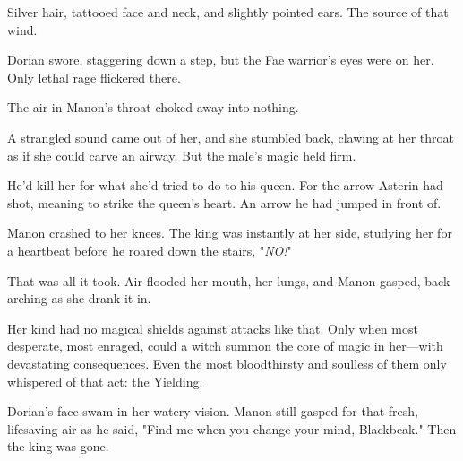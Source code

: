 Silver hair, tattooed face and neck, and slightly pointed ears.
The source of that wind.

Dorian swore, staggering down a step, but the Fae warrior's eyes were on her.
Only lethal rage flickered there.

The air in Manon's throat choked away into nothing.

A strangled sound came out of her, and she stumbled back, clawing at her throat as if she could carve an airway.
But the male's magic held firm.

He'd kill her for what she'd tried to do to his queen.
For the arrow Asterin had shot, meaning to strike the queen's heart.
An arrow he had jumped in front of.

Manon crashed to her knees.
The king was instantly at her side, studying her for a heartbeat before he roared down the stairs, "\emph{NO!}"

That was all it took.
Air flooded her mouth, her lungs, and Manon gasped, back arching as she drank it in.

Her kind had no magical shields against attacks like that.
Only when most desperate, most enraged, could a witch summon the core of magic in her---with devastating consequences.
Even the most bloodthirsty and soulless of them only whispered of that act: the Yielding.

Dorian's face swam in her watery vision.
Manon still gasped for that fresh, lifesaving air as he said, "Find me when you change your mind, Blackbeak."
Then the king was gone.
